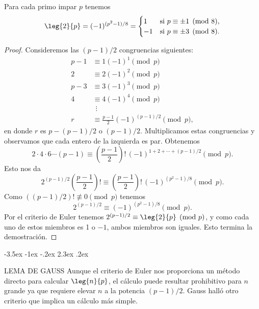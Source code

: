 \documentclass[12pt,a4paper]{book}
\makeatletter
\renewcommand\section{\@startsection{section}{1}{\z@}%
  {-3.5ex \@plus -1ex \@minus -.2ex}%
  {2.3ex \@plus .2ex}%
  {\normalfont\Large\bfseries\raggedright}}
\makeatother
\begin{document}
    \begin{teorema}\label{teo:9-5}
        Para cada primo impar $p$ tenemos
        \begin{equation*}
            \leg{2}{p}=(-1)^{(p^{2}-1)/8}=
            \begin{cases}
                1&\text{si }p\equiv\pm1\pmod{8},\\
                -1&\text{si }p\equiv\pm3\pmod{8}.
            \end{cases}
        \end{equation*}
    \end{teorema}

    \begin{proof}
        Consideremos las $(p-1)/2$ congruencias siguientes:
        \begin{align*}
            p-1&\equiv1(-1)^{1}\pmod{p}\\
            2&\equiv2(-1)^{2}\pmod{p}\\
            p-3&\equiv3(-1)^{3}\pmod{p}\\
            4&\equiv4(-1)^{4}\pmod{p}\\
            &\ \ \vdots\\
            r&\equiv\frac{p-1}{2}(-1)^{(p-1)/2}\pmod{p},
        \end{align*}
        en donde $r$ es $p-(p-1)/2$ o $(p-1)/2$. Multiplicamos estas congruencias y
        observamos que cada entero de la izquierda es par. Obtenemos
        \begin{equation*}
            2\cdot4\cdot6\cdots(p-1)\equiv\left(\frac{p-1}{2}\right)!\,(-1)^{1+2+\cdots+(p-1)/2}\pmod{p}.
        \end{equation*}
        Esto nos da
        \begin{equation*}
            2^{(p-1)/2}\left(\frac{p-1}{2}\right)!\equiv\left(\frac{p-1}{2}\right)!\,(-1)^{(p^{2}-1)/8}\pmod{p}.
        \end{equation*}
        Como $((p-1)/2)!\not\equiv0\pmod{p}$ tenemos
        \begin{equation*}
            2^{(p-1)/2}\equiv(-1)^{(p^{2}-1)/8}\pmod{p}.
        \end{equation*}
        Por el criterio de Euler tenemos $2^{(p-1)/2}\equiv\leg{2}{p}\pmod{p}$, y como cada
        uno de estos miembros es 1 o $-1$, ambos miembros son iguales. Esto termina la
        demostración.
    \end{proof}

    \section{LEMA DE GAUSS}
    Aunque el criterio de Euler nos proporciona un método directo para calcular
    $\leg{n}{p}$, el cálculo puede resultar prohibitivo para $n$ grande ya que requiere
    elevar $n$ a la potencia $(p-1)/2$. Gauss halló otro criterio que implica un cálculo
    más simple.
\end{document}
